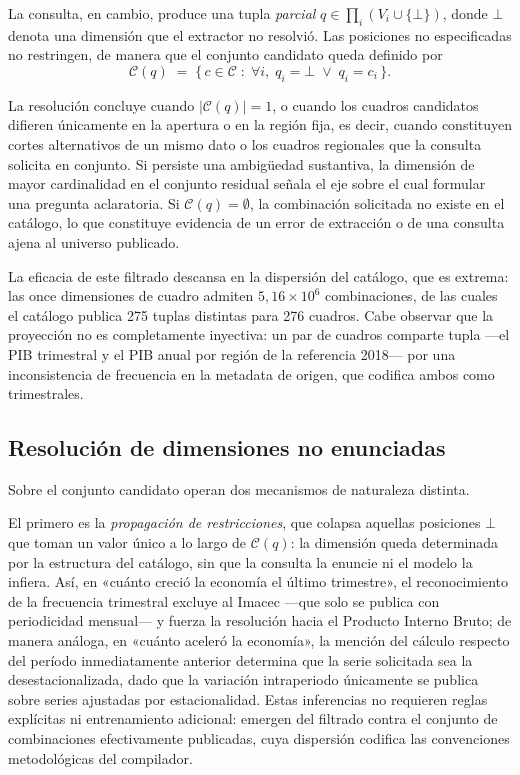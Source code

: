 \documentclass[11pt]{article}
\begin{document}
La consulta, en cambio, produce una tupla \emph{parcial}
$q \in \prod_i (V_i \cup \{\bot\})$, donde $\bot$ denota una dimensión que el
extractor no resolvió. Las posiciones no especificadas no restringen, de manera
que el conjunto candidato queda definido por
\[
  \mathcal{C}(q) \;=\; \{\, c \in \mathcal{C} \;:\;
  \forall i,\; q_i = \bot \;\lor\; q_i = c_i \,\}.
\]

La resolución concluye cuando $|\mathcal{C}(q)| = 1$, o cuando los cuadros
candidatos difieren únicamente en la apertura o en la región fija, es decir,
cuando constituyen cortes alternativos de un mismo dato o los cuadros regionales
que la consulta solicita en conjunto. Si persiste una ambigüedad sustantiva, la
dimensión de mayor cardinalidad en el conjunto residual señala el eje sobre el
cual formular una pregunta aclaratoria. Si $\mathcal{C}(q) = \emptyset$, la
combinación solicitada no existe en el catálogo, lo que constituye evidencia de
un error de extracción o de una consulta ajena al universo publicado.

La eficacia de este filtrado descansa en la dispersión del catálogo, que es
extrema: las once dimensiones de cuadro admiten $5{,}16 \times 10^{6}$
combinaciones, de las cuales el catálogo publica 275 tuplas distintas para 276
cuadros. Cabe observar que la proyección no es completamente inyectiva: un par
de cuadros comparte tupla ---el PIB trimestral y el PIB anual por región de la
referencia 2018--- por una inconsistencia de frecuencia en la metadata de
origen, que codifica ambos como trimestrales.

\subsection{Resolución de dimensiones no enunciadas}
\label{sec:defaults}

Sobre el conjunto candidato operan dos mecanismos de naturaleza distinta.

El primero es la \emph{propagación de restricciones}, que colapsa aquellas
posiciones $\bot$ que toman un valor único a lo largo de $\mathcal{C}(q)$: la
dimensión queda determinada por la estructura del catálogo, sin que la consulta
la enuncie ni el modelo la infiera. Así, en «cuánto creció la economía el último
trimestre», el reconocimiento de la frecuencia trimestral excluye al Imacec
---que solo se publica con periodicidad mensual--- y fuerza la resolución hacia
el Producto Interno Bruto; de manera análoga, en «cuánto aceleró la economía», la
mención del cálculo respecto del período inmediatamente anterior determina que la
serie solicitada sea la desestacionalizada, dado que la variación intraperiodo
únicamente se publica sobre series ajustadas por estacionalidad. Estas
inferencias no requieren reglas explícitas ni entrenamiento adicional: emergen
del filtrado contra el conjunto de combinaciones efectivamente publicadas, cuya
dispersión codifica las convenciones metodológicas del compilador.
\end{document}
